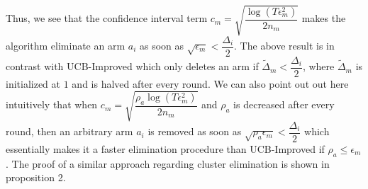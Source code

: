 \begin{remark}
	
	Thus, we see that the confidence interval term $c_{m}=\sqrt{\dfrac{\log (T\epsilon_{m}^{2})}{2 n_{m}}}$ makes the algorithm eliminate an arm $a_{i}$ as soon as $\sqrt{\epsilon_{m}}<\dfrac{\Delta_{i}}{2}$. The above result is in contrast with UCB-Improved which only deletes an arm if $\tilde{\Delta}_{m}<\dfrac{\Delta_{i}}{2}$, where $\tilde{\Delta}_{m}$ is initialized at $1$ and is halved after every round. We can also point out out here intuitively that when $c_{m}=\sqrt{\dfrac{\rho_{a}\log (T\epsilon_{m}^{2})}{2 n_{m}}}$ and $\rho_{a}$ is decreased after every round, then an arbitrary arm $a_{i}$ is removed as soon as  $\sqrt{\rho_{a}\epsilon_{m}}<\dfrac{\Delta_{i}}{2}$ which essentially makes it a faster elimination procedure than UCB-Improved if $\rho_{a}\leq \epsilon_{m}$. The proof of a similar approach regarding cluster elimination is shown in proposition 2.
\end{remark}
%
%
%
%
%	
